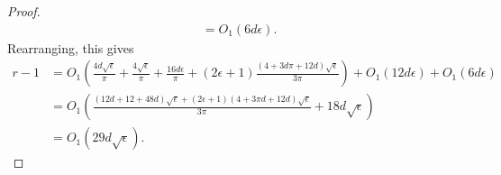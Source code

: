 \documentclass{article}
\begin{document}
\begin{proof}
\begin{align*}
& = O_1(6d\epsilon).
\end{align*} Rearranging, this gives \begin{align*}
r-1 & = O_1\left(\frac{4d\sqrt{\epsilon}}{\pi} + \frac{4\sqrt{\epsilon}}{\pi} + \frac{16d\epsilon}{\pi} + (2\epsilon + 1)\frac{(4 + 3d\pi + 12d)\sqrt{\epsilon}}{3\pi}\right) + O_1(12d\epsilon) + O_1(6d\epsilon)  \\
& = O_1\left(\frac{(12d + 12 + 48d)\sqrt{\epsilon} + (2\epsilon + 1)(4 + 3\pi d + 12d)\sqrt{\epsilon}}{3\pi} + 18d\sqrt{\epsilon}\right)\\
& = O_1(29d \sqrt{\epsilon}).
\end{align*}


\end{proof}
\end{document}

